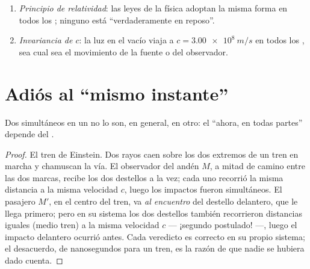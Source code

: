 \begin{theorem}\label{thm:g12:special-relativity:postulates}
\begin{enumerate}
  \item \emph{Principio de relatividad}: las leyes de la física adoptan la misma forma
        en todos los ; ninguno está ``verdaderamente en reposo''.
  \item \emph{Invariancia de $c$}: la luz en el vacío viaja a
        $c = \qty{3.00e8}{m/s}$ en todos los , sea cual sea el
        movimiento de la fuente o del observador.
\end{enumerate}
\end{theorem}
\admitted

\section{Adiós al ``mismo instante''}

\begin{proposition}\label{prop:g12:special-relativity:simultaneity}
Dos  simultáneos en un  no lo son, en general, en otro: el
``ahora, en todas partes'' depende del .
\end{proposition}

\begin{proof}
El tren de Einstein. Dos rayos caen sobre los dos extremos de un tren en marcha y
chamuscan la vía. El observador del andén $M$, a mitad de camino entre las dos marcas,
recibe los dos destellos a la vez; cada uno recorrió la misma distancia a la misma
velocidad $c$, luego los impactos fueron simultáneos. El pasajero $M'$, en el centro
del tren, va \emph{al encuentro} del destello delantero, que le llega primero; pero en
su sistema los dos destellos también recorrieron distancias iguales (medio tren) a la
misma velocidad $c$ --- ¡segundo postulado! ---, luego el impacto delantero ocurrió
antes. Cada veredicto es correcto en su propio sistema; el desacuerdo, de nanosegundos
para un tren, es la razón de que nadie se hubiera dado cuenta.
\end{proof}

